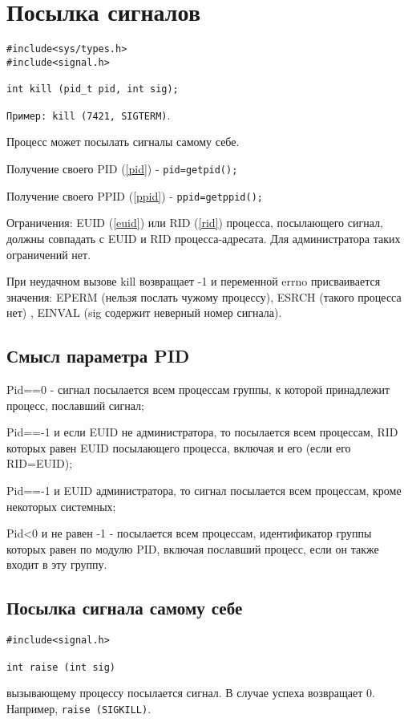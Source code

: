 \section{Посылка сигналов}

\begin{verbatim}
#include<sys/types.h>
#include<signal.h>

int kill (pid_t pid, int sig);
\end{verbatim}

\verb+Пример: kill (7421, SIGTERM)+.

Процесс может посылать сигналы самому себе.

Получение своего PID (\ref{pid}) - \verb+pid=getpid();+ 

Получение своего PPID (\ref{ppid}) - \verb+ppid=getppid();+

Ограничения: EUID (\ref{euid}) или RID (\ref{rid}) процесса, посылающего сигнал, должны совпадать с EUID и RID процесса-адресата. Для администратора таких ограничений нет.

При неудачном вызове kill возвращает -1 и переменной errno присваивается значения: EPERM (нельзя послать чужому процессу), ESRCH (такого процесса нет) , EINVAL (sig содержит неверный номер сигнала).

\subsection{Смысл параметра PID}

Pid==0 - сигнал посылается всем процессам группы, к которой принадлежит процесс, пославший сигнал;

Pid==-1 и если EUID не администратора, то посылается всем процессам, RID которых равен EUID посылающего процесса, включая и его (если его RID=EUID);

Pid==-1 и EUID администратора, то сигнал посылается всем процессам, кроме некоторых системных;

Pid<0 и не равен -1 - посылается всем процессам, идентификатор группы которых равен по модулю PID, включая пославший процесс, если он также входит в эту группу.

\subsection{Посылка сигнала самому себе}

\begin{verbatim}
#include<signal.h>

int raise (int sig)
\end{verbatim}
вызывающему процессу посылается сигнал. В случае успеха возвращает 0. Например, \verb+raise (SIGKILL)+.

